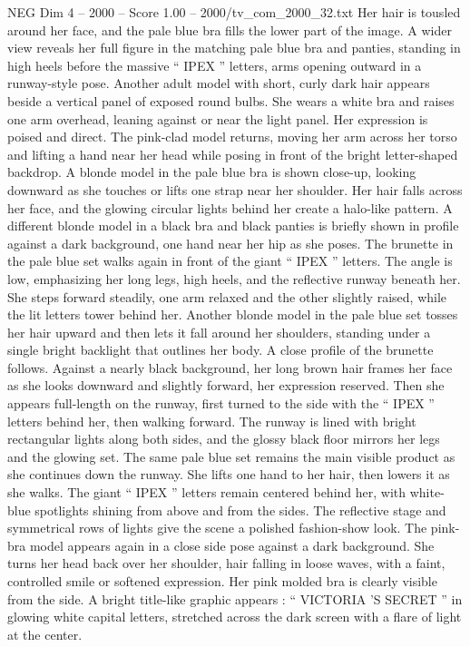 \begin{textsample}{NEG Dim 4 – 2000 – Score 1.00 – 2000/tv\_com\_2000\_32.txt}
Her hair is tousled around her face, and the pale blue bra fills the lower part of the image.
A wider view reveals her full figure in the matching pale blue bra and panties, standing in high heels before the massive “ IPEX ” letters, arms opening outward in a runway-style pose.
Another adult model with short, curly dark hair appears beside a vertical panel of exposed round bulbs.
She wears a white bra and raises one arm overhead, leaning against or near the light panel.
Her expression is poised and direct.
The pink-clad model returns, moving her arm across her torso and lifting a hand near her head while posing in front of the bright letter-shaped backdrop.
A blonde model in the pale blue bra is shown close-up, looking downward as she touches or lifts one strap near her shoulder.
Her hair falls across her face, and the glowing circular lights behind her create a halo-like pattern.
A different blonde model in a black bra and black panties is briefly shown in profile against a dark background, one hand near her hip as she poses.
The brunette in the pale blue set walks again in front of the giant “ IPEX ” letters.
The angle is low, emphasizing her long legs, high heels, and the reflective runway beneath her.
She steps forward steadily, one arm relaxed and the other slightly raised, while the lit letters tower behind her.
Another blonde model in the pale blue set tosses her hair upward and then lets it fall around her shoulders, standing under a single bright backlight that outlines her body.
A close profile of the brunette follows.
Against a nearly black background, her long brown hair frames her face as she looks downward and slightly forward, her expression reserved.
Then she appears full-length on the runway, first turned to the side with the “ IPEX ” letters behind her, then walking forward.
The runway is lined with bright rectangular lights along both sides, and the glossy black floor mirrors her legs and the glowing set.
The same pale blue set remains the main visible product as she continues down the runway.
She lifts one hand to her hair, then lowers it as she walks.
The giant “ IPEX ” letters remain centered behind her, with white-blue spotlights shining from above and from the sides.
The reflective stage and symmetrical rows of lights give the scene a polished fashion-show look.
The pink-bra model appears again in a close side pose against a dark background.
She turns her head back over her shoulder, hair falling in loose waves, with a faint, controlled smile or softened expression.
Her pink molded bra is clearly visible from the side.
A bright title-like graphic appears : “ VICTORIA ’S SECRET ” in glowing white capital letters, stretched across the dark screen with a flare of light at the center.

\end{textsample}
